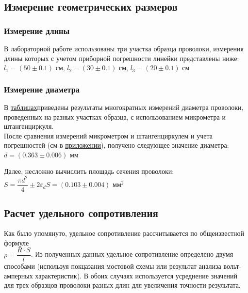 \documentclass[12pt]{article}
\begin{document}
\subsection{Измерение геометрических размеров}
\subsubsection{Измерение длины}
В лабораторной работе использованы три участка образца проволоки, измерения длины которых с учетом приборной погрешности линейки представлены ниже: \\
$l_1 = (50\pm 0.1)\text{ см}$, $l_2 = (30\pm 0.1)\text{ см}$, $l_3 = (20\pm 0.1)\text{ см}$ \\

\subsubsection{Измерение диаметра}
В \hyperref[sec: length measurements]{таблицах}приведены результаты многократных измерений диаметра проволоки, проведенных на разных участках образца, с использованием микрометра и штангенциркуля.\\

После сравнения измерений микрометром и штангенциркулем и учета погрешностей (см в \hyperref[sec: diameter measurements]{приложении}), получено следующее значение диаметра:
$d = (0.363 \pm 0.006)$ мм

Далее, несложно вычислить площадь сечения проволоки: $S = \dfrac{\pi d^2}{4} \pm 2\varepsilon_d S  = (0.103 \pm 0.004)$ мм$^2$


\subsection{Расчет удельного сопротивления}
Как было упомянуто, удельное сопротивление рассчитывается по общеизвестной формуле\\ $\rho = \dfrac{R\cdot S}{l}$.
Из полученных данных удельное сопротивление определено двумя способами (используя покцазания мостовой схемы или результат анализа вольт-амперных характеристик). В обоих случаях используется усреднение значений для трех образцов проволоки разных длин для увеличения точности результата.
\end{document}
